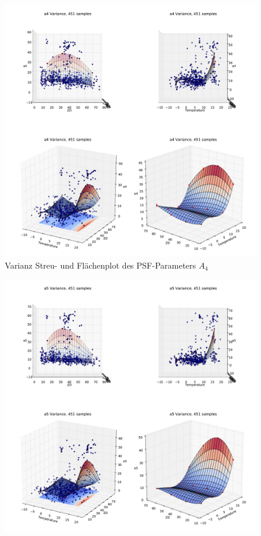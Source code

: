 \begin{appendix}
\begin{figure}[H]
	\centering
	\includegraphics[scale=.48]{psf_surf/a4_var.pdf}
	\caption[Varianz Streu- und Flächenplot des PSF-Parameters $A_4$]{Varianz Streu- und Flächenplot des PSF-Parameters $A_4$}
    \label{psf_surf_a4_var}
\end{figure}
\begin{figure}[H]
	\centering
	\includegraphics[scale=.48]{psf_surf/a5_var.pdf}

\end{figure}
\end{appendix}
